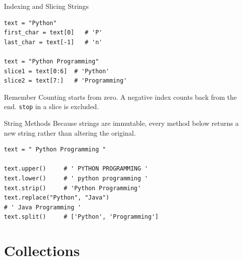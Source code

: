 \documentclass[9pt,aspectratio=169,xcolor=table]{beamer}
\begin{document}
\begin{frame}[fragile]{Indexing and Slicing Strings}
    \leavevmode
\begin{lstlisting}
text = "Python"
first_char = text[0]   # 'P'
last_char = text[-1]   # 'n'

text = "Python Programming"
slice1 = text[0:6]  # 'Python'
slice2 = text[7:]   # 'Programming'
\end{lstlisting}

    \vspace{2mm}
    \begin{block}{Remember}
        Counting starts from zero. A negative index counts back from
        the end. \texttt{stop} in a slice is \alert{excluded}.
    \end{block}
\end{frame}

\begin{frame}[fragile]{String Methods}
    \leavevmode
    Because strings are immutable, every method below returns a
    \alert{new} string rather than altering the original.

\begin{lstlisting}
text = " Python Programming "

text.upper()     # ' PYTHON PROGRAMMING '
text.lower()     # ' python programming '
text.strip()     # 'Python Programming'
text.replace("Python", "Java")
# ' Java Programming '
text.split()     # ['Python', 'Programming']
\end{lstlisting}
\end{frame}

\section{Collections}
\end{document}
